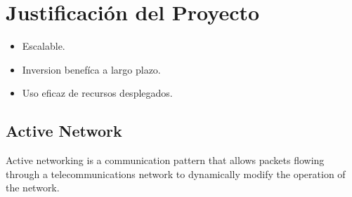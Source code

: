 \section{Justificaci\'on del Proyecto}\label{sec:justificacion}

\begin{itemize}
	\item Escalable.
	\item Inversion benefíca a largo plazo.
	\item Uso eficaz de recursos desplegados.
\end{itemize}

\subsection{Active Network}

Active networking is a communication pattern that allows packets flowing through a telecommunications network to dynamically modify the operation of the network.


